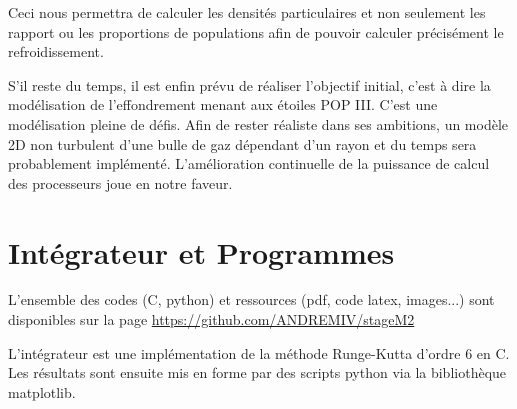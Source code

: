 \documentclass[10pt, a4paper]{report}
\numberwithin{equation}{subsection}
\begin{document}
Ceci nous permettra de calculer les densités particulaires et non seulement les rapport ou les proportions de populations afin de pouvoir calculer précisément le refroidissement.

S'il reste du temps, il est enfin prévu de réaliser l'objectif initial, c'est à dire la modélisation de l'effondrement menant aux étoiles POP III. C'est une modélisation pleine de défis. Afin de rester réaliste dans ses ambitions, un modèle 2D non turbulent d'une bulle de gaz dépendant d'un rayon et du temps sera probablement implémenté. L'amélioration continuelle de la puissance de calcul des processeurs joue en notre faveur. 

\appendix

\chapter{Intégrateur et Programmes}
L'ensemble des codes (C, python) et ressources (pdf, code latex, images...) sont disponibles sur la page \url{https://github.com/ANDREMIV/stageM2}

L'intégrateur est une implémentation de la méthode Runge-Kutta d'ordre 6 en C. Les résultats sont ensuite mis en forme par des scripts python via la bibliothèque matplotlib. 

\end{document}
